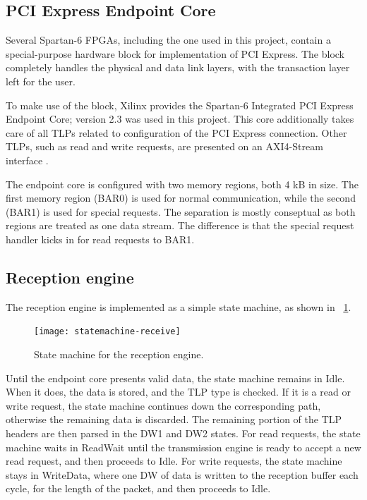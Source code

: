 \subsection{PCI Express Endpoint Core}

Several Spartan-6 FPGAs, including the one used in this project, contain a special-purpose hardware block for implementation of PCI Express.
The block completely handles the physical and data link layers, with the transaction layer left for the user.

To make use of the block, Xilinx provides the Spartan-6 Integrated PCI Express Endpoint Core; version 2.3 was used in this project.
This core additionally takes care of all TLPs related to configuration of the PCI Express connection.
Other TLPs, such as read and write requests, are presented on an AXI4-Stream interface \cite{ug672}.

The endpoint core is configured with two memory regions, both 4 kB in size\footnotemark.
The first memory region (BAR0) is used for normal communication, while the second (BAR1) is used for special requests.
The separation is mostly conseptual as both regions are treated as one data stream.
The difference is that the special request handler kicks in for read requests to BAR1.

\subsection{Reception engine}

The reception engine is implemented as a simple state machine, as shown in \figurename~\ref{fig:statemachine-receive}.

\begin{figure}[!ht]
    \centering
    \texttt{[image: statemachine-receive]}
    \caption[Reception engine state machine]{
        State machine for the reception engine.
    }
    \label{fig:statemachine-receive}
\end{figure}

Until the endpoint core presents valid data, the state machine remains in Idle.
When it does, the data is stored, and the TLP type is checked.
If it is a read or write request, the state machine continues down the corresponding path, otherwise the remaining data is discarded.
The remaining portion of the TLP headers are then parsed in the DW1 and DW2 states.
For read requests, the state machine waits in ReadWait until the transmission engine is ready to accept a new read request, and then proceeds to Idle.
For write requests, the state machine stays in WriteData, where one DW of data is written to the reception buffer each cycle, for the length of the packet, and then proceeds to Idle.

